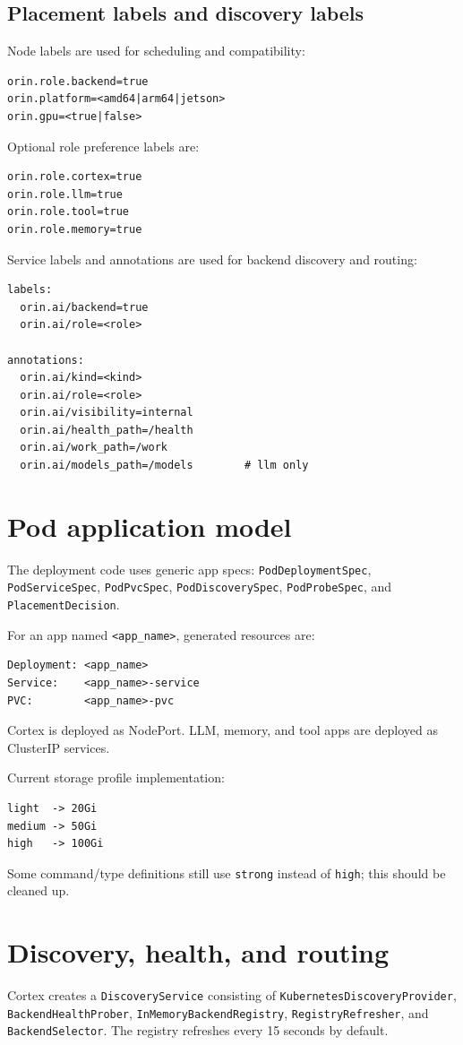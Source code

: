 \documentclass[11pt,a4paper]{article}
\begin{document}
\subsection{Placement labels and discovery labels}
Node labels are used for scheduling and compatibility:
\begin{lstlisting}
orin.role.backend=true
orin.platform=<amd64|arm64|jetson>
orin.gpu=<true|false>
\end{lstlisting}

Optional role preference labels are:
\begin{lstlisting}
orin.role.cortex=true
orin.role.llm=true
orin.role.tool=true
orin.role.memory=true
\end{lstlisting}

Service labels and annotations are used for backend discovery and routing:
\begin{lstlisting}
labels:
  orin.ai/backend=true
  orin.ai/role=<role>

annotations:
  orin.ai/kind=<kind>
  orin.ai/role=<role>
  orin.ai/visibility=internal
  orin.ai/health_path=/health
  orin.ai/work_path=/work
  orin.ai/models_path=/models        # llm only
\end{lstlisting}

\section{Pod application model}
The deployment code uses generic app specs: \texttt{PodDeploymentSpec}, \texttt{PodServiceSpec}, \texttt{PodPvcSpec}, \texttt{PodDiscoverySpec}, \texttt{PodProbeSpec}, and \texttt{PlacementDecision}.

For an app named \texttt{<app\_name>}, generated resources are:
\begin{lstlisting}
Deployment: <app_name>
Service:    <app_name>-service
PVC:        <app_name>-pvc
\end{lstlisting}

Cortex is deployed as NodePort. LLM, memory, and tool apps are deployed as ClusterIP services.

Current storage profile implementation:
\begin{lstlisting}
light  -> 20Gi
medium -> 50Gi
high   -> 100Gi
\end{lstlisting}

Some command/type definitions still use \texttt{strong} instead of \texttt{high}; this should be cleaned up.

\section{Discovery, health, and routing}
Cortex creates a \texttt{DiscoveryService} consisting of \texttt{KubernetesDiscoveryProvider}, \texttt{BackendHealthProber}, \texttt{InMemoryBackendRegistry}, \texttt{RegistryRefresher}, and \texttt{BackendSelector}. The registry refreshes every 15 seconds by default.
\end{document}
